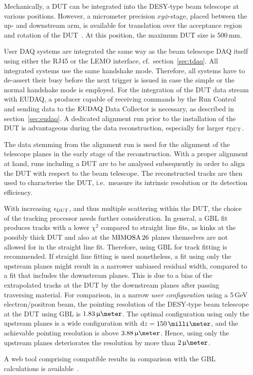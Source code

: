 Mechanically, a DUT can be integrated into the DESY-type beam telescope at various positions. 
However, a micrometer precision $xy\phi$-stage, placed between the up- and downstream arm, is available for translation over the acceptance region and rotation of the DUT~\cite{Mimosa-twiki}.
At this position, the maximum DUT size is 500\,mm.

User DAQ systems are integrated the same way as the beam telescope DAQ itself using either the RJ45 or the LEMO interface, cf.~section~\ref{sec:tdaq}.
All integrated systems use the same handshake mode.
Therefore, all systems have to de-assert their busy before the next trigger is issued in case the simple or the normal handshake mode is employed. 
For the integration of the DUT data stream with EUDAQ, a producer capable of receiving commands by the Run Control and sending data to the $\textrm{EUDAQ}$ Data Collector is necessary,
 as described in section~\ref{sec:eudaq}.
A dedicated alignment run prior to the installation of the DUT is advantageous during the data reconstruction, especially for larger $\mathnormal{\epsilon_{\textrm{DUT}}}$.

The data stemming from the alignment run is used for the alignment of the telescope planes in the early stage of the reconstruction. 
With a proper alignment at hand, runs including a DUT are to be analysed subsequently in order to align the DUT with respect to the beam telescope. 
The reconstructed tracks are then used to characterise the DUT, i.e.\ measure its intrinsic resolution or its detection efficiency. 

With increasing $\mathnormal{\epsilon_{\textrm{DUT}}}$, and thus multiple scattering within the DUT, the choice of the tracking processor needs further consideration. 
In general, a GBL fit produces tracks with a lower $\chi^2$ compared to straight line fits,
 as kinks at the possibly thick DUT and also at the $\textrm{MIMOSA\,26}$ planes themselves are not allowed for in the straight line fit.
Therefore, using GBL for track fitting is recommended. 
If straight line fitting is used nonetheless, a fit using only the upstream planes might result in a narrower unbiased residual width, compared to a fit that includes the downstream planes. 
This is due to a bias of the extrapolated tracks at the DUT by the downstream planes after passing traversing material. 
For comparison, in a narrow \textit{user configuration} using a 5\,GeV electron/positron beam, the pointing resolution of the DESY-type beam telescope at the DUT using GBL is $1.83\,\upmu\meter$. 
The optimal configuration using only the upstream planes is a wide configuration with $\dz = 150\,\milli\meter$,
 and the achievable pointing resolution is above $3.88\,\upmu\meter$. 
Hence, using only the upstream planes deteriorates the resolution by more than $2\,\upmu\meter$.

A web tool comprising compatible results in comparison with the GBL calculations is available~\cite{webtool}.
